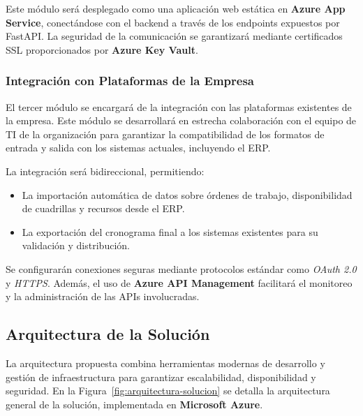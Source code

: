 \documentclass{article}
\begin{document}
Este módulo será desplegado como una aplicación web estática en \textbf{Azure App Service}, conectándose con el backend a través de los endpoints expuestos por FastAPI. La seguridad de la comunicación se garantizará mediante certificados SSL proporcionados por \textbf{Azure Key Vault}.

\subsubsection{Integración con Plataformas de la Empresa}

El tercer módulo se encargará de la integración con las plataformas existentes de la empresa. Este módulo se desarrollará en estrecha colaboración con el equipo de TI de la organización para garantizar la compatibilidad de los formatos de entrada y salida con los sistemas actuales, incluyendo el ERP.

La integración será bidireccional, permitiendo:
\begin{itemize}
    \item La importación automática de datos sobre órdenes de trabajo, disponibilidad de cuadrillas y recursos desde el ERP.
    \item La exportación del cronograma final a los sistemas existentes para su validación y distribución.
\end{itemize}

Se configurarán conexiones seguras mediante protocolos estándar como \textit{OAuth 2.0} y \textit{HTTPS}. Además, el uso de \textbf{Azure API Management} facilitará el monitoreo y la administración de las APIs involucradas.

\subsection{Arquitectura de la Solución}

La arquitectura propuesta combina herramientas modernas de desarrollo y gestión de infraestructura para garantizar escalabilidad, disponibilidad y seguridad. En la Figura~\ref{fig:arquitectura-solucion} se detalla la arquitectura general de la solución, implementada en \textbf{Microsoft Azure}.
\end{document}
